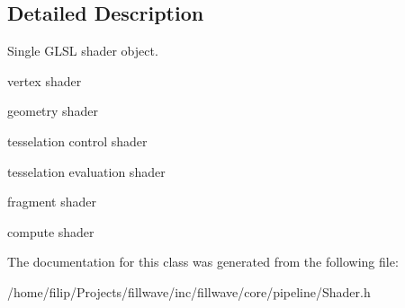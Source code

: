 \subsection{Detailed Description}
Single G\+L\+SL shader object. 


\begin{DoxyItemize}
\item vertex shader
\item geometry shader
\item tesselation control shader
\item tesselation evaluation shader
\item fragment shader
\item compute shader 
\end{DoxyItemize}

The documentation for this class was generated from the following file\+:\begin{DoxyCompactItemize}
\item 
/home/filip/\+Projects/fillwave/inc/fillwave/core/pipeline/Shader.\+h\end{DoxyCompactItemize}
